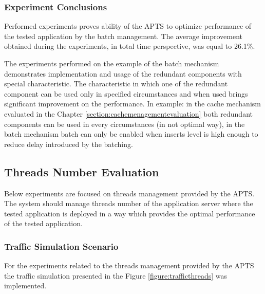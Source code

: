 \documentclass[12pt,a4paper]{article}
\begin{document}
\subsubsection{Experiment Conclusions} 

Performed experiments proves ability of the APTS to optimize performance of the tested application by the batch management. The average improvement obtained during the experiments, in total time perspective, was equal to 26.1\%. 

The experiments performed on the example of the batch mechanism demonstrates implementation and usage of the redundant components with special characteristic. The characteristic in which one of the redundant component can be used only in specified circumstances and when used brings significant improvement on the performance. In example: in the cache mechanism evaluated in the Chapter \ref{section:cachemenagementevaluation} both redundant components can be used in every circumstances (in not optimal way), in the batch mechanism batch can only be enabled when inserts level is high enough to reduce delay introduced by the batching.  


\subsection{Threads Number Evaluation}

Below experiments are focused on threads management provided by the APTS. The system should manage threads number of the application server where the tested application is deployed in a way which provides the optimal performance of the tested application. 

\subsubsection{Traffic Simulation Scenario}

For the experiments related to the threads management provided by the APTS the traffic simulation presented in the Figure \ref{figure:trafficthreads} was implemented. 
\end{document}
